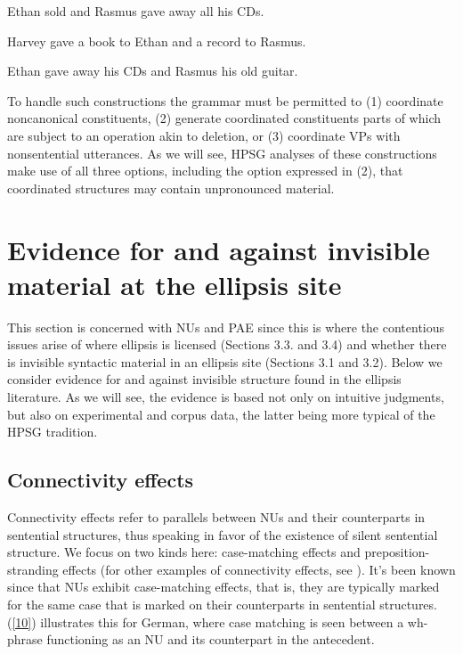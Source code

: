 \documentclass[output=paper
                ,modfonts
                ,nonflat
	        ,collection
	        ,collectionchapter
	        ,collectiontoclongg
 	        ,biblatex
                ,babelshorthands
                ,newtxmath
                ,draftmode
                ,colorlinks, citecolor=brown
]{./langsci/langscibook}
\begin{document}
{ \ea Ethan sold and Rasmus gave away all his CDs. \label{8}\z

\ea Harvey gave a book to Ethan and a record to Rasmus. \label{acc}\z

 \ea Ethan gave away his CDs and Rasmus his old guitar. \label{9}\z


 To handle such constructions the grammar must be permitted to (1) coordinate noncanonical constituents, (2) generate coordinated constituents parts of which are subject to an operation akin to deletion, or (3) coordinate VPs with nonsentential utterances. As we will see, HPSG analyses of these constructions make use of all three options, including the option expressed in (2), that coordinated structures may contain unpronounced material.

\section{Evidence for and against invisible material at the ellipsis site}
\label{sec-evidence-for-invisible-material}

This section is concerned with NUs and PAE since this is where the contentious issues arise of where ellipsis is licensed (Sections 3.3. and 3.4) and whether there is invisible syntactic material in an ellipsis site (Sections 3.1 and 3.2). Below we consider evidence for and against invisible structure found in the ellipsis literature. As we will see, the evidence is based not only on intuitive judgments, but also on experimental and corpus data, the latter being more typical of the HPSG tradition.


\subsection{Connectivity effects}
\label{sec-connectivity-effects}

Connectivity effects refer to parallels between NUs and their counterparts in sentential structures, thus speaking in favor of the existence of silent sentential structure. We focus on two kinds here: case-matching effects and preposition-stranding effects (for other examples of connectivity effects, see \citealt{Ginzburg2018}). It's been known since \citet{Ross1969} that NUs exhibit case-matching effects, that is, they are typically marked for the same case that is marked on their counterparts in sentential structures. (\ref{10}) illustrates this for German, where case matching is seen between a wh-phrase functioning as an NU and its counterpart in the antecedent.

}
\end{document}
